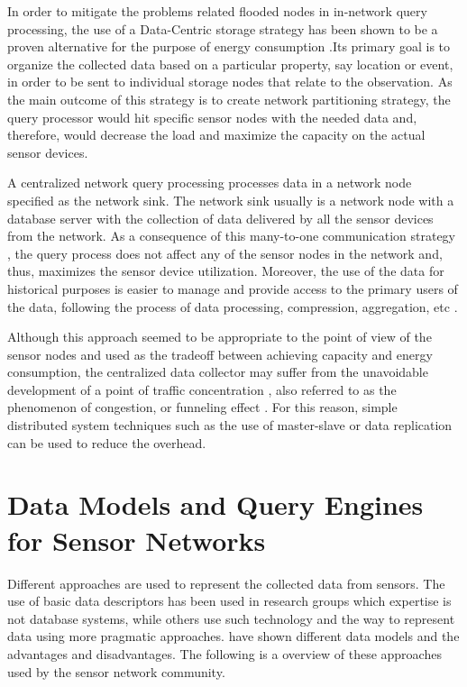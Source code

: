 In order to mitigate the problems related flooded nodes in in-network query
processing, the use of a Data-Centric storage strategy has been shown to be a
proven alternative for the purpose of energy consumption
\cite{sn-storage03}\cite{sn-storage01}.Its primary goal is to organize the
collected data based on a particular property, say location or event, in order
to be sent to individual storage nodes that relate to the observation. As the
main outcome of this strategy is to create network partitioning strategy, the
query processor would hit specific sensor nodes with the needed data and,
therefore, would decrease the load and maximize the capacity on the actual
sensor devices.

A centralized network query processing processes data in a network node
specified as the network sink. The network sink usually is a network node with
a database server with the collection of data delivered by all the sensor
devices from the network. As a consequence of this many-to-one communication
strategy \cite{sn-storage02}, the query process does not affect any of the
sensor nodes in the network and, thus, maximizes the sensor device
utilization. Moreover, the use of the data for historical purposes is easier
to manage and provide access to the primary users of the data, following the
process of data processing, compression, aggregation, etc
\cite{sn-db-modeling02}.

Although this approach seemed to be appropriate to the point of view of the
sensor nodes and used as the tradeoff between achieving capacity and energy
consumption, the centralized data collector may suffer from the unavoidable
development of a point of traffic concentration \cite{sn-storage02}, also
referred to as the phenomenon of congestion, or funneling effect
\cite{sn-storage04}. For this reason, simple distributed system techniques
such as the use of master-slave or data replication can be used to reduce the
overhead.

\section{Data Models and Query Engines for Sensor Networks}
\label{sec:data-models}

Different approaches are used to represent the collected data from sensors. The
use of basic data descriptors has been used in research groups which expertise
is not database systems, while others use such technology and the way to
represent data using more pragmatic approaches. \cite{sn-data-model-survey}
have shown different data models and the advantages and disadvantages. The 
following is a overview of these approaches used by the sensor network
community.

